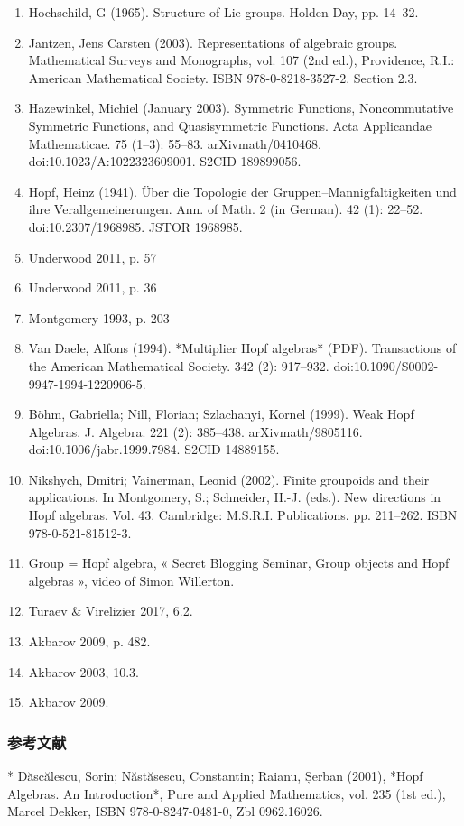 \begin{enumerate}
\item Hochschild, G (1965). Structure of Lie groups. Holden-Day, pp. 14–32.
\item Jantzen, Jens Carsten (2003). Representations of algebraic groups. Mathematical Surveys and Monographs, vol. 107 (2nd ed.), Providence, R.I.: American Mathematical Society. ISBN 978-0-8218-3527-2. Section 2.3.
\item Hazewinkel, Michiel (January 2003). Symmetric Functions, Noncommutative Symmetric Functions, and Quasisymmetric Functions. Acta Applicandae Mathematicae. 75 (1–3): 55–83. arXiv\:math/0410468. doi:10.1023/A:1022323609001. S2CID 189899056.
\item Hopf, Heinz (1941). Über die Topologie der Gruppen–Mannigfaltigkeiten und ihre Verallgemeinerungen. Ann. of Math. 2 (in German). 42 (1): 22–52. doi:10.2307/1968985. JSTOR 1968985.
\item Underwood 2011, p. 57
\item Underwood 2011, p. 36
\item Montgomery 1993, p. 203
\item Van Daele, Alfons (1994). *Multiplier Hopf algebras* (PDF). Transactions of the American Mathematical Society. 342 (2): 917–932. doi:10.1090/S0002-9947-1994-1220906-5.
\item Böhm, Gabriella; Nill, Florian; Szlachanyi, Kornel (1999). Weak Hopf Algebras. J. Algebra. 221 (2): 385–438. arXiv\:math/9805116. doi:10.1006/jabr.1999.7984. S2CID 14889155.
\item Nikshych, Dmitri; Vainerman, Leonid (2002). Finite groupoids and their applications. In Montgomery, S.; Schneider, H.-J. (eds.). New directions in Hopf algebras. Vol. 43. Cambridge: M.S.R.I. Publications. pp. 211–262. ISBN 978-0-521-81512-3.
\item Group = Hopf algebra, « Secret Blogging Seminar, Group objects and Hopf algebras », video of Simon Willerton.
\item Turaev & Virelizier 2017, 6.2.
\item Akbarov 2009, p. 482.
\item Akbarov 2003, 10.3.
\item Akbarov 2009.
\end{enumerate}
\subsubsection{参考文献}

* Dăscălescu, Sorin; Năstăsescu, Constantin; Raianu, Șerban (2001), *Hopf Algebras. An Introduction*, Pure and Applied Mathematics, vol. 235 (1st ed.), Marcel Dekker, ISBN 978-0-8247-0481-0, Zbl 0962.16026.

